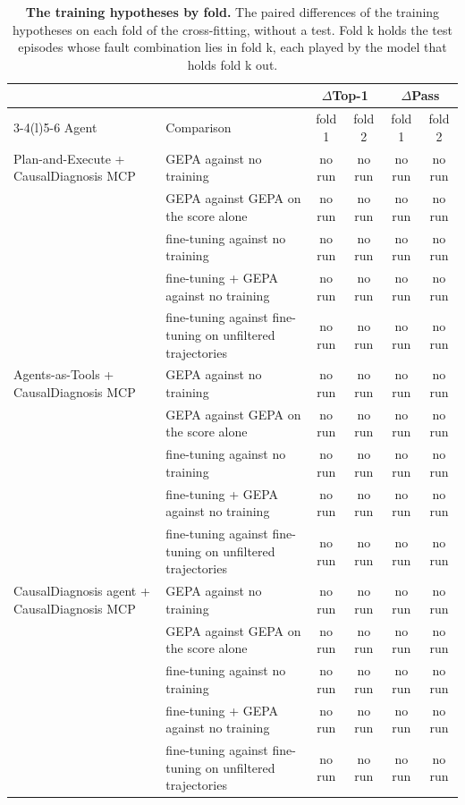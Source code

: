 \documentclass[10pt]{article}
\begin{document}
\begin{table}[H]\centering\footnotesize
\caption{\textbf{The training hypotheses by fold.} The paired differences of the training hypotheses on each fold of the cross-fitting, without a test. Fold k holds the test episodes whose fault combination lies in fold k, each played by the model that holds fold k out.}
\label{tab:trainfolds}
\setlength{\tabcolsep}{3pt}
\begin{tabular}{llcccc}
\toprule
 & & \multicolumn{2}{c}{$\Delta$Top-1} & \multicolumn{2}{c}{$\Delta$Pass} \\
\cmidrule(lr){3-4}\cmidrule(l){5-6}
Agent & Comparison & fold 1 & fold 2 & fold 1 & fold 2 \\
\midrule
Plan-and-Execute + CausalDiagnosis MCP & GEPA against no training & no run & no run & no run & no run \\
 & GEPA against GEPA on the score alone & no run & no run & no run & no run \\
 & fine-tuning against no training & no run & no run & no run & no run \\
 & fine-tuning + GEPA against no training & no run & no run & no run & no run \\
 & fine-tuning against fine-tuning on unfiltered trajectories & no run & no run & no run & no run \\
\midrule
Agents-as-Tools + CausalDiagnosis MCP & GEPA against no training & no run & no run & no run & no run \\
 & GEPA against GEPA on the score alone & no run & no run & no run & no run \\
 & fine-tuning against no training & no run & no run & no run & no run \\
 & fine-tuning + GEPA against no training & no run & no run & no run & no run \\
 & fine-tuning against fine-tuning on unfiltered trajectories & no run & no run & no run & no run \\
\midrule
CausalDiagnosis agent + CausalDiagnosis MCP & GEPA against no training & no run & no run & no run & no run \\
 & GEPA against GEPA on the score alone & no run & no run & no run & no run \\
 & fine-tuning against no training & no run & no run & no run & no run \\
 & fine-tuning + GEPA against no training & no run & no run & no run & no run \\
 & fine-tuning against fine-tuning on unfiltered trajectories & no run & no run & no run & no run \\
\bottomrule
\end{tabular}
\end{table}
\end{document}
